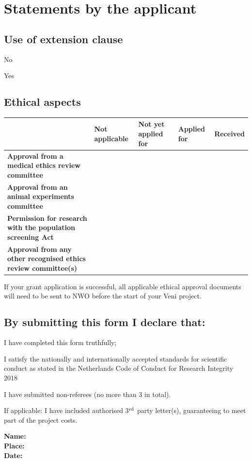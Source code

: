 \documentclass[10pt]{article}
\newcommand{\cmark}{\ding{51}}%
\newcommand{\done}{\rlap{\color{sectionblue}$\square$}{\raisebox{2pt}{\large\hspace{1pt}\cmark}}\hspace{-2.5pt}}
\newcommand{\tableheadfont}{\bfseries\fontsize{10}{10}\selectfont\leavevmode\color{tableblue}}
\begin{document}
	\section*{Statements by the applicant}
	\subsection*{Use of extension clause}
	\begin{todolist}
		\setlength\itemsep{0em}
		\item[\done] No
		\item Yes
	\end{todolist}
	
	\subsection*{Ethical aspects}
	{\renewcommand{\arraystretch}{1.5}
	\begin{tabularx}{\linewidth}{|p{5cm}|X|X|X|X|}
		\arrayrulecolor[gray]{0.4}\hline
		{\rowcolor[gray]{0.95}} & {\tableheadfont Not applicable} & {\tableheadfont Not yet applied for}  & {\tableheadfont Applied for} & {\tableheadfont Received} \\\hline
		{\cellcolor[gray]{0.95}\tableheadfont Approval from a medical ethics review committee} & & & & \\\hline
		{\cellcolor[gray]{0.95}\tableheadfont Approval from an animal experiments committee} & & & & \\\hline
		{\cellcolor[gray]{0.95}\tableheadfont Permission for research with the population screening Act} & & & & \\\hline
		{\cellcolor[gray]{0.95}\tableheadfont Approval from any other recognised ethics review committee(s)} & & & & \\\hline
	\end{tabularx}
	}
	
	If your grant application is successful, all applicable ethical approval documents will need to be sent to NWO before the start of your Veni project.
    
 	\subsection*{By submitting this form I declare that:}
 	\begin{todolist}
		\setlength\itemsep{0em}
		\item[\done] I have completed this form truthfully;
		\item[\done] I satisfy the nationally and internationally accepted standards for scientific conduct as stated in the Netherlands Code of Conduct for Research Integrity 2018
        \item I have submitted non-referees (no more than 3 in total). 
        \item If applicable: I have included authorised 3$^{\rm rd}$ party letter(s), guaranteeing to meet part of the project costs.
	\end{todolist}
    
    {\tableheadfont Name:}	 
    \\
    
    {\tableheadfont Place:}	 
    \\
    
    {\tableheadfont Date:}	 
    \\
    
\end{document}
